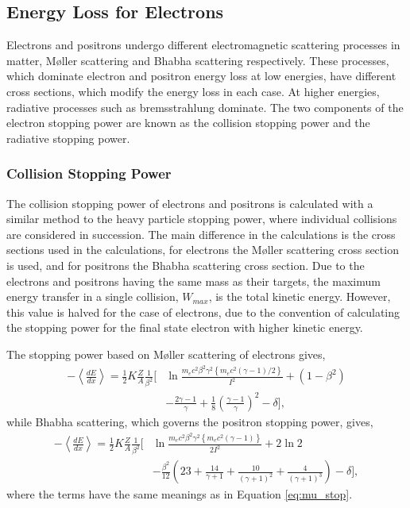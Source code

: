 \subsection{Energy Loss for Electrons}
Electrons and positrons undergo different electromagnetic scattering processes
in matter, M{\o}ller scattering and Bhabha scattering 
respectively\cite{10.2307/96528, 10.2307/96479}. These processes, which 
dominate electron and positron energy loss at low energies, have different 
cross sections, which modify the energy loss in each case. At higher energies, 
radiative processes such as bremsstrahlung dominate. The two components of the 
electron stopping power are known as the collision stopping power and the 
radiative stopping power.

\subsubsection*{Collision Stopping Power}
The collision stopping power of electrons and positrons is calculated with a
similar method to the heavy particle stopping power, where individual collisions
are considered in succession. The main difference in the calculations is the
cross sections used in the calculations, for electrons the M{\o}ller scattering
cross section is used, and for positrons the Bhabha scattering cross section. 
Due to the electrons and positrons having the same mass as their targets, the 
maximum energy transfer in a single collision, $W_{max}$, is the total kinetic 
energy.  However, this value is halved for the case of electrons, due to the 
convention of calculating the stopping power for the final state electron with 
higher kinetic energy.

The stopping power based on M{\o}ller scattering of electrons gives,
\begin{align*}
	- \left< \frac{dE}{dx} \right> = \frac{1}{2} K \frac{Z}{A} \frac{1}{\beta^2}
	\bigg[ &\ln \frac{m_e c^2 \beta^2 \gamma^2 \left\{ m_e c^2 (\gamma - 1) / 2
	\right\} }{I^2} + (1 - \beta^2) \\
	&- \frac{2\gamma - 1}{\gamma} + \frac{1}{8} 
	\left(\frac{\gamma - 1}{\gamma}\right)^2 - \delta \bigg],
\end{align*}
while Bhabha scattering, which governs the positron stopping power, gives,
\begin{align*}
	- \left< \frac{dE}{dx} \right> = \frac{1}{2} K \frac{Z}{A} \frac{1}{\beta^2}
	\bigg[ &\ln \frac{m_e c^2 \beta^2 \gamma^2 \left\{ m_e c^2 (\gamma - 1) 
	\right\} }{2 I^2} 
	+ 2 \ln 2  \\ &-\frac{\beta^2}{12} \left(23 + \frac{14}{\gamma + 1} +
	\frac{10}{(\gamma + 1)^2} + \frac{4}{(\gamma + 1)^3}\right) - \delta \bigg],
\end{align*}
where the terms have the same meanings as in Equation 
\ref{eq:mu_stop}\cite{PhysRevD.98.030001}.

